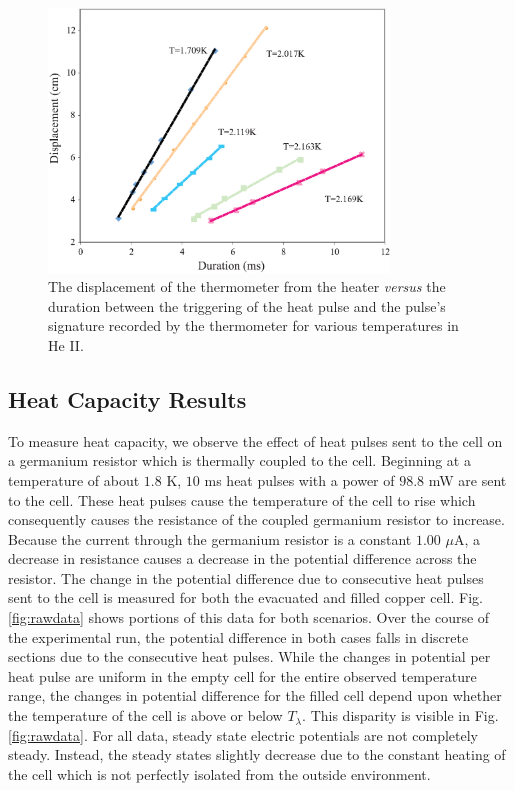 \begin{figure}[htbp]
\begin{center}
\includegraphics[height=70mm]{./figures/secondsoundraw.eps}
\caption{\small{The displacement of the thermometer from the heater \emph{versus} the duration between the triggering of the heat pulse and the pulse's signature recorded by the thermometer for various temperatures in He II.}}
\label{fig:secondsoundraw}
\end{center}
\end{figure}


\subsection{Heat Capacity Results}\label{heatcapacityresults}

To measure heat capacity, we observe the effect of heat pulses sent to the cell on a germanium resistor which is thermally coupled to the cell. Beginning at a temperature of about $1.8$ K, $10$ ms heat pulses with a power of $98.8$ mW are sent to the cell.  These heat pulses cause the temperature of the cell to rise which consequently causes the resistance of the coupled germanium resistor to increase.  Because the current through the germanium resistor is a constant $1.00$ $\mu$A, a decrease in resistance causes a decrease in the potential difference across the resistor. The change in the potential difference due to consecutive heat pulses sent to the cell is measured for both the evacuated and filled copper cell. Fig. \ref{fig:rawdata} shows portions of this data for both scenarios.  Over the course of the experimental run, the potential difference in both cases falls in discrete sections due to the consecutive heat pulses. While the changes in potential per heat pulse are uniform in the empty cell for the entire observed temperature range, the changes in potential difference for the filled cell depend upon whether the temperature of the cell is above or below $T_{\lambda}$. This disparity is visible in Fig. \ref{fig:rawdata}. For all data, steady state electric potentials are not completely steady.  Instead, the steady states slightly decrease due to the constant heating of the cell which is not perfectly isolated from the outside environment.

